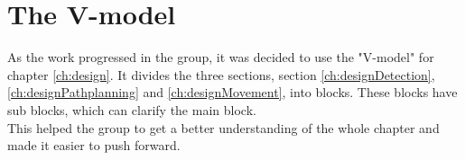 \section{The V-model}
As the work progressed in the group, it was decided to use the "V-model" for chapter \ref{ch:design}.
It divides the three sections, section \ref{ch:designDetection}, \ref{ch:designPathplanning} and \ref{ch:designMovement}, into blocks. These blocks have sub blocks, which can clarify the main block.\\ 
This helped the group to get a better understanding of the whole chapter and made it easier to push forward.